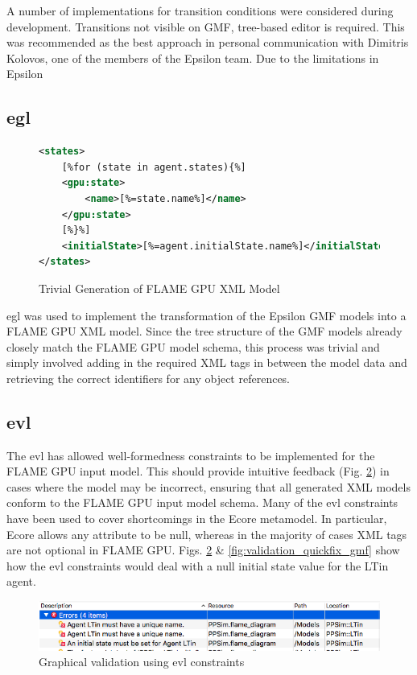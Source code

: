 \documentclass{UoYCSproject}
\begin{document}


A number of implementations for transition conditions were considered during development.
Transitions not visible on GMF, tree-based editor is required.
This was recommended as the best approach in personal communication with Dimitris Kolovos, one of the members of the Epsilon team.
Due to the limitations in Epsilon

\subsection{\acrfull{egl}}
\begin{figure}
\centering
\begin{lstlisting}[language=XML, basicstyle=\tiny]
<states>
    [%for (state in agent.states){%]
    <gpu:state>
        <name>[%=state.name%]</name>
    </gpu:state>
    [%}%]
    <initialState>[%=agent.initialState.name%]</initialState>
</states>
\end{lstlisting}
\caption{Trivial Generation of \gls{FLAME GPU} XML Model}
\label{fig:egl_example}
\end{figure}

\gls{egl} was used to implement the transformation of the Epsilon GMF models into a \gls{FLAME GPU} XML model.
Since the tree structure of the GMF models already closely match the \gls{FLAME GPU} model schema, this process was trivial and simply involved adding in the required XML tags in between the model data and retrieving the correct identifiers for any object references.

\subsection{\acrfull{evl}}
The \gls{evl} has allowed well-formedness constraints to be implemented for the \gls{FLAME GPU} input model.
This should provide intuitive feedback (Fig. \ref{fig:validation_gmf}) in cases where the model may be incorrect, ensuring that all generated XML models conform to the \gls{FLAME GPU} input model schema.
Many of the \gls{evl} constraints have been used to cover shortcomings in the Ecore metamodel.
In particular, Ecore allows any attribute to be null, whereas in the majority of cases XML tags are not optional in \gls{FLAME GPU}.
Figs. \ref{fig:validation_gmf} \& \ref{fig:validation_quickfix_gmf} show how the \gls{evl} constraints would deal with a null initial state value for the \gls{LTin} agent.

\begin{figure}[htp]
\centering
\includegraphics[width=\textwidth]{Appendix/validation_gmf}
\caption{Graphical validation using \gls{evl} constraints}
\label{fig:validation_gmf}
\end{figure}
\end{document}
